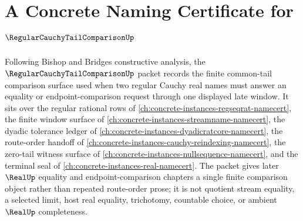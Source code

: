 \chapter{A Concrete Naming Certificate for $\RegularCauchyTailComparisonUp$}
\label{ch:concrete-instances-regular-cauchy-tail-comparison-namecert}

Following Bishop and Bridges constructive analysis, the $\RegularCauchyTailComparisonUp$ packet records the finite common-tail comparison surface used when two regular Cauchy real names must answer an equality or endpoint-comparison request through one displayed late window. It sits over the regular rational rows of \autoref{ch:concrete-instances-regseqrat-namecert}, the finite window surface of \autoref{ch:concrete-instances-streamname-namecert}, the dyadic tolerance ledger of \autoref{ch:concrete-instances-dyadicratcore-namecert}, the route-order handoff of \autoref{ch:concrete-instances-cauchy-reindexing-namecert}, the zero-tail witness surface of \autoref{ch:concrete-instances-nullsequence-namecert}, and the terminal seal of \autoref{ch:concrete-instances-real-namecert}. The packet gives later $\RealUp$ equality and endpoint-comparison chapters a single finite comparison object rather than repeated route-order prose; it is not quotient stream equality, a selected limit, host real equality, trichotomy, countable choice, or ambient $\RealUp$ completeness.


